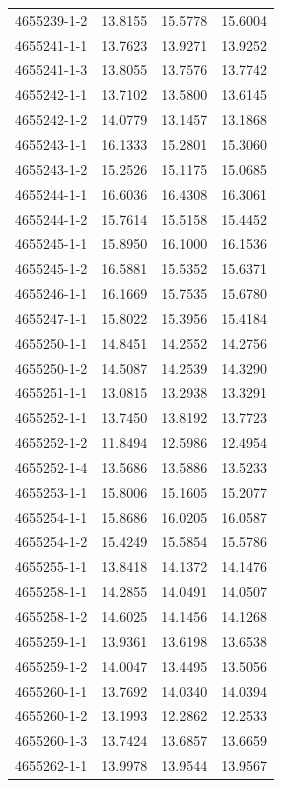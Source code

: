 \begin{longtable}{lrrr}
4655239-1-2 & 13.8155 & 15.5778 & 15.6004 \\
4655241-1-1 & 13.7623 & 13.9271 & 13.9252 \\
4655241-1-3 & 13.8055 & 13.7576 & 13.7742 \\
4655242-1-1 & 13.7102 & 13.5800 & 13.6145 \\
4655242-1-2 & 14.0779 & 13.1457 & 13.1868 \\
4655243-1-1 & 16.1333 & 15.2801 & 15.3060 \\
4655243-1-2 & 15.2526 & 15.1175 & 15.0685 \\
4655244-1-1 & 16.6036 & 16.4308 & 16.3061 \\
4655244-1-2 & 15.7614 & 15.5158 & 15.4452 \\
4655245-1-1 & 15.8950 & 16.1000 & 16.1536 \\
4655245-1-2 & 16.5881 & 15.5352 & 15.6371 \\
4655246-1-1 & 16.1669 & 15.7535 & 15.6780 \\
4655247-1-1 & 15.8022 & 15.3956 & 15.4184 \\
4655250-1-1 & 14.8451 & 14.2552 & 14.2756 \\
4655250-1-2 & 14.5087 & 14.2539 & 14.3290 \\
4655251-1-1 & 13.0815 & 13.2938 & 13.3291 \\
4655252-1-1 & 13.7450 & 13.8192 & 13.7723 \\
4655252-1-2 & 11.8494 & 12.5986 & 12.4954 \\
4655252-1-4 & 13.5686 & 13.5886 & 13.5233 \\
4655253-1-1 & 15.8006 & 15.1605 & 15.2077 \\
4655254-1-1 & 15.8686 & 16.0205 & 16.0587 \\
4655254-1-2 & 15.4249 & 15.5854 & 15.5786 \\
4655255-1-1 & 13.8418 & 14.1372 & 14.1476 \\
4655258-1-1 & 14.2855 & 14.0491 & 14.0507 \\
4655258-1-2 & 14.6025 & 14.1456 & 14.1268 \\
4655259-1-1 & 13.9361 & 13.6198 & 13.6538 \\
4655259-1-2 & 14.0047 & 13.4495 & 13.5056 \\
4655260-1-1 & 13.7692 & 14.0340 & 14.0394 \\
4655260-1-2 & 13.1993 & 12.2862 & 12.2533 \\
4655260-1-3 & 13.7424 & 13.6857 & 13.6659 \\
4655262-1-1 & 13.9978 & 13.9544 & 13.9567 \\

\end{longtable}

